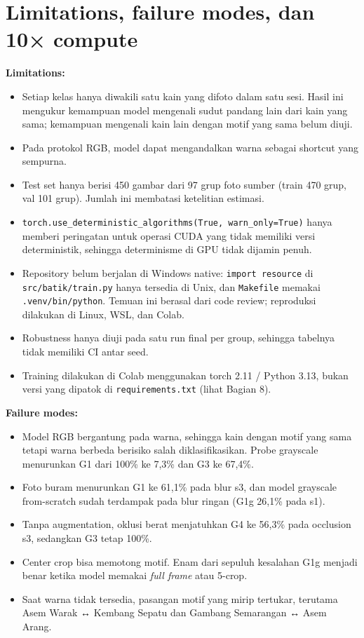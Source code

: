 \documentclass[10pt,a4paper]{article}
\providecommand{\tightlist}{\setlength{\itemsep}{2pt}\setlength{\parskip}{0pt}}
\begin{document}
\section{Limitations, failure modes, dan 10× compute}\label{limitations-failure-modes-dan-10-compute}

\textbf{Limitations:}

\begin{itemize}
\tightlist
\item
  Setiap kelas hanya diwakili satu kain yang difoto dalam satu sesi. Hasil ini mengukur kemampuan model mengenali sudut pandang lain dari kain yang sama; kemampuan mengenali kain lain dengan motif yang sama belum diuji.
\item
  Pada protokol RGB, model dapat mengandalkan warna sebagai shortcut yang sempurna.
\item
  Test set hanya berisi 450 gambar dari 97 grup foto sumber (train 470 grup, val 101 grup). Jumlah ini membatasi ketelitian estimasi.
\item
  \texttt{torch.use\_deterministic\_algorithms(True,\ warn\_only=True)} hanya memberi peringatan untuk operasi CUDA yang tidak memiliki versi deterministik, sehingga determinisme di GPU tidak dijamin penuh.
\item
  Repository belum berjalan di Windows native: \texttt{import\ resource} di \texttt{src/\allowbreak{}batik/\allowbreak{}train.py} hanya tersedia di Unix, dan \texttt{Makefile} memakai \texttt{.venv/\allowbreak{}bin/\allowbreak{}python}. Temuan ini berasal dari code review; reproduksi dilakukan di Linux, WSL, dan Colab.
\item
  Robustness hanya diuji pada satu run final per group, sehingga tabelnya tidak memiliki CI antar seed.
\item
  Training dilakukan di Colab menggunakan torch 2.11 / Python 3.13, bukan versi yang dipatok di \texttt{requirements.txt} (lihat Bagian 8).
\end{itemize}

\textbf{Failure modes:}

\begin{itemize}
\tightlist
\item
  Model RGB bergantung pada warna, sehingga kain dengan motif yang sama tetapi warna berbeda berisiko salah diklasifikasikan. Probe grayscale menurunkan G1 dari 100\% ke 7,3\% dan G3 ke 67,4\%.
\item
  Foto buram menurunkan G1 ke 61,1\% pada blur s3, dan model grayscale from-scratch sudah terdampak pada blur ringan (G1g 26,1\% pada s1).
\item
  Tanpa augmentation, oklusi berat menjatuhkan G4 ke 56,3\% pada occlusion s3, sedangkan G3 tetap 100\%.
\item
  Center crop bisa memotong motif. Enam dari sepuluh kesalahan G1g menjadi benar ketika model memakai \emph{full frame} atau 5-crop.
\item
  Saat warna tidak tersedia, pasangan motif yang mirip tertukar, terutama Asem Warak ↔ Kembang Sepatu dan Gambang Semarangan ↔ Asem Arang.
\end{itemize}
\end{document}
